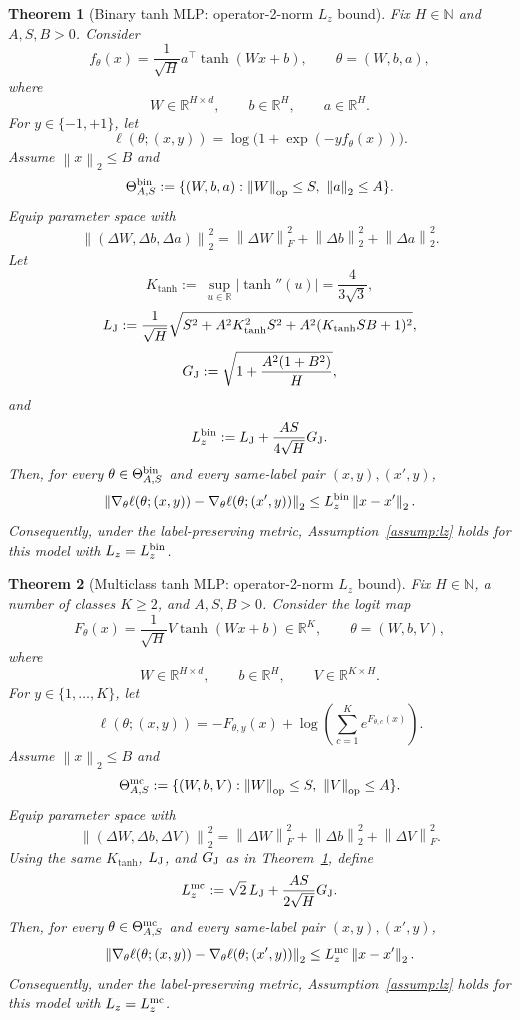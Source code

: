 \documentclass[conference,compsoc]{IEEEtran}
\newtheorem{theorem}{Theorem}
\newcommand{\R}{\mathbb{R}}
\newcommand{\op}{\mathrm{op}}
\newcommand{\norm}[1]{\left\lVert #1\right\rVert}
\begin{document}
\begin{theorem}[Binary tanh MLP: operator-2-norm $L_z$ bound]
\label{thm:binary-tanh-op-lz}
Fix $H\in\mathbb N$ and $A,S,B>0$.  Consider
\[
f_\theta(x)=\frac1{\sqrt H}a^\top \tanh(Wx+b),
\qquad
\theta=(W,b,a),
\]
where
\[
W\in\R^{H\times d},
\qquad
b\in\R^H,
\qquad
a\in\R^H.
\]
For $y\in\{-1,+1\}$, let
\[
\ell(\theta;(x,y))
=
\log\bigl(1+\exp(-y f_\theta(x))\bigr).
\]
Assume $\norm{x}_2\le B$ and
\[
\Theta_{A,S}^{\rm bin}
:=
\{(W,b,a):\norm{W}_{\op}\le S,\ \norm{a}_2\le A\}.
\]
Equip parameter space with
\[
\norm{(\Delta W,\Delta b,\Delta a)}_2^2
=
\norm{\Delta W}_F^2+\norm{\Delta b}_2^2+\norm{\Delta a}_2^2.
\]
Let
\[
K_{\tanh}:=\
\sup_{u\in\R}|\tanh''(u)|=\frac{4}{3\sqrt3},
\]
\[
L_{\rm J}
:=
\frac1{\sqrt H}
\sqrt{
S^2+A^2K_{\tanh}^2S^2+A^2(K_{\tanh}SB+1)^2
},
\]
\[
G_{\rm J}
:=
\sqrt{1+\frac{A^2(1+B^2)}{H}},
\]
and
\[
L_z^{\rm bin}
:=
L_{\rm J}+\frac{AS}{4\sqrt H}G_{\rm J}.
\]
Then, for every $\theta\in\Theta_{A,S}^{\rm bin}$ and every same-label pair
$(x,y),(x',y)$,
\[
\norm{\nabla_\theta\ell(\theta;(x,y))
-
\nabla_\theta\ell(\theta;(x',y))}_2
\le
L_z^{\rm bin}\norm{x-x'}_2.
\]
Consequently, under the label-preserving metric, Assumption~\ref{assump:lz}
holds for this model with $L_z=L_z^{\rm bin}$.
\end{theorem}

\begin{theorem}[Multiclass tanh MLP: operator-2-norm $L_z$ bound]
\label{thm:multiclass-tanh-op-lz}
Fix $H\in\mathbb N$, a number of classes $K\ge2$, and $A,S,B>0$.  Consider the
logit map
\[
F_\theta(x)=\frac1{\sqrt H}V\tanh(Wx+b)\in\R^K,
\qquad
\theta=(W,b,V),
\]
where
\[
W\in\R^{H\times d},
\qquad
b\in\R^H,
\qquad
V\in\R^{K\times H}.
\]
For $y\in\{1,\ldots,K\}$, let
\[
\ell(\theta;(x,y))
=
-F_{\theta,y}(x)+\log\!\left(\sum_{c=1}^K e^{F_{\theta,c}(x)}\right).
\]
Assume $\norm{x}_2\le B$ and
\[
\Theta_{A,S}^{\rm mc}
:=
\{(W,b,V):\norm{W}_{\op}\le S,\ \norm{V}_{\op}\le A\}.
\]
Equip parameter space with
\[
\norm{(\Delta W,\Delta b,\Delta V)}_2^2
=
\norm{\Delta W}_F^2+\norm{\Delta b}_2^2+\norm{\Delta V}_F^2.
\]
Using the same $K_{\tanh}$, $L_{\rm J}$, and $G_{\rm J}$ as in
Theorem~\ref{thm:binary-tanh-op-lz}, define
\[
L_z^{\rm mc}
:=
\sqrt2\,L_{\rm J}+\frac{AS}{2\sqrt H}G_{\rm J}.
\]
Then, for every $\theta\in\Theta_{A,S}^{\rm mc}$ and every same-label pair
$(x,y),(x',y)$,
\[
\norm{\nabla_\theta\ell(\theta;(x,y))
-
\nabla_\theta\ell(\theta;(x',y))}_2
\le
L_z^{\rm mc}\norm{x-x'}_2.
\]
Consequently, under the label-preserving metric, Assumption~\ref{assump:lz}
holds for this model with $L_z=L_z^{\rm mc}$.
\end{theorem}
\end{document}
